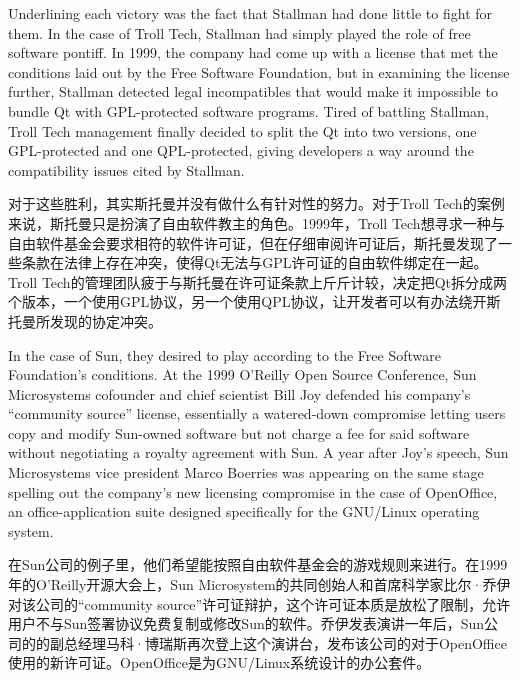 
\ifdefined\eng
Underlining each victory was the fact that Stallman had done little to fight for them. In the case of Troll Tech, Stallman had simply played the role of free software pontiff. In 1999, the company had come up with a license that met the conditions laid out by the Free Software Foundation, but in examining the license further, Stallman detected legal incompatibles that would make it impossible to bundle Qt with GPL-protected software programs. Tired of battling Stallman, Troll Tech management finally decided to split the Qt into two versions, one GPL-protected and one QPL-protected, giving developers a way around the compatibility issues cited by Stallman.
\fi

\ifdefined\chs
对于这些胜利，其实斯托曼并没有做什么有针对性的努力。对于Troll Tech的案例来说，斯托曼只是扮演了自由软件教主的角色。1999年，Troll Tech想寻求一种与自由软件基金会要求相符的软件许可证，但在仔细审阅许可证后，斯托曼发现了一些条款在法律上存在冲突，使得Qt无法与GPL许可证的自由软件绑定在一起。Troll Tech的管理团队疲于与斯托曼在许可证条款上斤斤计较，决定把Qt拆分成两个版本，一个使用GPL协议，另一个使用QPL协议，让开发者可以有办法绕开斯托曼所发现的协定冲突。
\fi

\ifdefined\eng
In the case of Sun, they desired to play according to the Free Software Foundation's conditions. At the 1999 O'Reilly Open Source Conference, Sun Microsystems cofounder and chief scientist Bill Joy defended his company's ``community source'' license, essentially a watered-down compromise letting users copy and modify Sun-owned software but not charge a fee for said software without negotiating a royalty agreement with Sun. A year after Joy's speech, Sun Microsystems vice president Marco Boerries was appearing on the same stage spelling out the company's new licensing compromise in the case of OpenOffice, an office-application suite designed specifically for the GNU/Linux operating system.
\fi

\ifdefined\chs
在Sun公司的例子里，他们希望能按照自由软件基金会的游戏规则来进行。在1999年的O'Reilly开源大会上，Sun Microsystem的共同创始人和首席科学家比尔·乔伊对该公司的``community source''许可证辩护，这个许可证本质是放松了限制，允许用户不与Sun签署协议免费复制或修改Sun的软件。乔伊发表演讲一年后，Sun公司的的副总经理马科·博瑞斯再次登上这个演讲台，发布该公司的对于OpenOffice使用的新许可证。OpenOffice是为GNU/Linux系统设计的办公套件。
\fi

